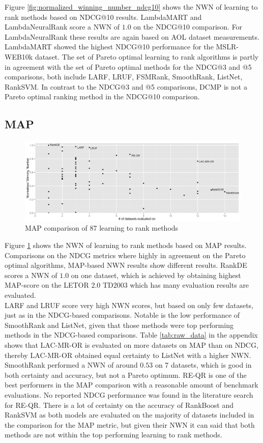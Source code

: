 \documentclass[english, authoryear, preprint]{elsarticle}
\begin{document}
Figure \ref{fig:normalized_winning_number_ndcg10} shows the NWN of learning to rank methods based on NDCG@10 results. LambdaMART and LambdaNeuralRank score a NWN of $1.0$ on the NDCG@10 comparison. For LambdaNeuralRank these results are again based on AOL dataset measurements. LambdaMART showed the highest NDCG@10 performance for the MSLR-WEB10k dataset. The set of Pareto optimal learning to rank algorithms is partly in agreement with the set of Pareto optimal methods for the NDCG@3 and @5 comparisons, both include {LARF, LRUF, FSMRank, SmoothRank, ListNet, RankSVM}. In contrast to the NDCG@3 and @5 comparisons, DCMP is not a Pareto optimal ranking method in the NDCG@10 comparison.

\subsection{MAP}
\begin{figure}
\centering
\includegraphics[scale=0.26]{gfx/map_winnum}
\caption{MAP comparison of 87 learning to rank methods}
\label{fig:normalized_winning_number_map}
\end{figure}
Figure \ref{fig:normalized_winning_number_map} shows the NWN of learning to rank methods based on MAP results. Comparisons on the NDCG metrics where highly in agreement on the Pareto optimal algorithms, MAP-based NWN results show different results. RankDE scores a NWN of $1.0$ on one dataset, which is achieved by obtaining highest MAP-score on the LETOR 2.0 TD2003 which has many evaluation results are evaluated.\\

LARF and LRUF score very high NWN scores, but based on only few datasets, just as in the NDCG-based comparisons. Notable is the low performance of SmoothRank and ListNet, given that those methods were top performing methods in the NDCG-based comparisons. Table \ref{tab:raw_data} in the appendix shows that LAC-MR-OR is evaluated on more datasets on MAP than on NDCG, thereby LAC-MR-OR obtained equal certainty to ListNet with a higher NWN. SmoothRank performed a NWN of around $0.53$ on 7 datasets, which is good in both certainty and accuracy, but not a Pareto optimum. RE-QR is one of the best performers in the MAP comparison with a reasonable amount of benchmark evaluations. No reported NDCG performance was found in the literature search for RE-QR. There is a lot of certainty on the accuracy of RankBoost and RankSVM as both models are evaluated on the majority of datasets included in the comparison for the MAP metric, but given their NWN it can said that both methods are not within the top performing learning to rank methods.
\end{document}
